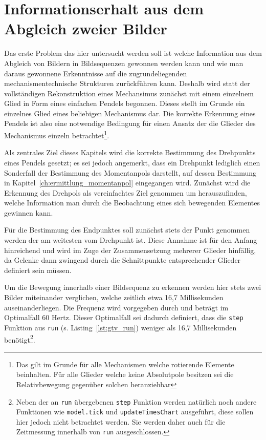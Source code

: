 
\chapter{Informationserhalt aus dem Abgleich zweier Bilder}\label{ch:infoerhalt_aus_abgleich_bilder}


Das erste Problem das hier untersucht werden soll ist welche Information aus dem Abgleich von Bildern in Bildsequenzen gewonnen werden kann und wie man daraus gewonnene Erkenntnisse auf die zugrundeliegenden mechanismentechnische Strukturen zurückführen kann.
Deshalb wird statt der vollständigen Rekonstruktion eines Mechansimus zunächst mit einem einzelnem Glied in Form eines einfachen Pendels begonnen.
Dieses stellt im Grunde ein einzelnes Glied eines beliebigen Mechanismus dar.
Die korrekte Erkennung eines Pendels ist also eine notwendige Bedingung für einen Ansatz der die Glieder des Mechanismus einzeln betrachtet\footnote{Das gilt im Grunde für alle Mechanismen welche rotierende Elemente beinhalten. Für alle Glieder welche keine Absolutpole besitzen sei die Relativbewegung gegenüber solchen heranziehbar}.

Als zentrales Ziel dieses Kapitels wird die korrekte Bestimmung des Drehpunkts eines Pendels gesetzt; es sei jedoch angemerkt, dass ein Drehpunkt lediglich einen Sonderfall der Bestimmung des Momentanpols darstellt, auf dessen Bestimmung in Kapitel~\ref{ch:ermittlung_momentanpol} eingegangen wird.
Zunächst wird die Erkennung des Drehpols als vereinfachtes Ziel genommen um herauszufinden, welche Information man durch die Beobachtung eines sich bewegenden Elementes gewinnen kann.

Für die Bestimmung des Endpunktes soll zunächst stets der Punkt genommen werden der am weitesten vom Drehpunkt ist.
Diese Annahme ist für den Anfang hinreichend und wird im Zuge der Zusammensetzung mehrerer Glieder hinfällig, da Gelenke dann zwingend durch die Schnittpunkte entsprechender Glieder definiert sein müssen.

Um die Bewegung innerhalb einer Bildsequenz zu erkennen werden hier stets zwei Bilder miteinander verglichen, welche zeitlich etwa 16,7 Millisekunden auseinanderliegen.
Die Frequenz wird vorgegeben durch  und beträgt im Optimalfall 60 Hertz.
Dieser Optimalfall sei dadurch definiert, dass die \lstinline{step} Funktion aus \lstinline{run} (s. Listing~\ref{lst:gtv_run}) weniger als 16,7 Millisekunden benötigt\footnote{Neben der an \lstinline{run} übergebenen \lstinline{step} Funktion werden natürlich noch andere Funktionen wie \lstinline{model.tick} und \lstinline{updateTimesChart} ausgeführt, diese sollen hier jedoch nicht betrachtet werden. Sie werden daher auch für die Zeitmessung innerhalb von \lstinline{run} ausgeschlossen.}.


